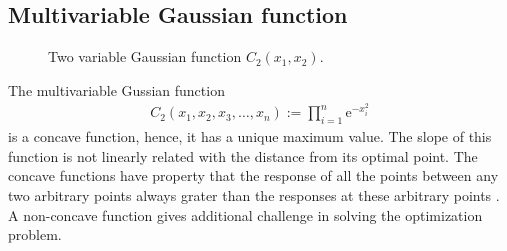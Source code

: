 \documentclass[twocolumn]{svjour3}          %
\newcommand{\me}{\mathrm{e}}
\begin{document}
\subsection{Multivariable Gaussian function}
\begin{figure}
	\centering
	\label{Fig:TwoVarGaussian}
	\caption{Two variable Gaussian function $C_2(x_1, x_2)$.}
\end{figure}
The multivariable Gussian function
\begin{eqnarray}
	C_2(x_1, x_2, x_3, \dots, x_n) := \prod_{i=1}^{n}{\me^{-x_i^2}} \label{Eqn:MultiFactorialNormal}
\end{eqnarray}
is a concave function, hence, it has a unique maximum value. The slope of this function is not linearly related with the distance from its optimal point. The concave functions have property that the response of all the points between any two arbitrary points always grater than the responses at these arbitrary points \cite{antoniou2007practical}. A non-concave function gives additional challenge in solving the optimization problem. 
\end{document}
